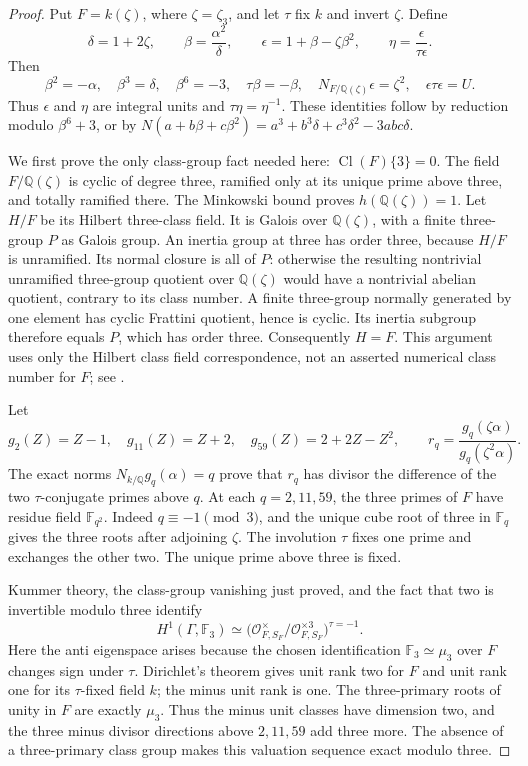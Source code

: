 \begin{proof}
Put \(F=k(\zeta)\), where \(\zeta=\zeta_3\), and let
\(\tau\) fix \(k\) and invert \(\zeta\).  Define
\[
 \delta=1+2\zeta,\qquad
 \beta=\frac{\alpha^2}{\delta},\qquad
 \epsilon=1+\beta-\zeta\beta^2,\qquad
 \eta=\frac{\epsilon}{\tau\epsilon}.
\tag{E.166.4}
\]
Then
\[
 \beta^2=-\alpha,\quad \beta^3=\delta,\quad
 \beta^6=-3,\quad \tau\beta=-\beta,\quad
 N_{F/\mathbb Q(\zeta)}\epsilon=\zeta^2,\quad
 \epsilon\tau\epsilon=U.
\tag{E.166.5}
\]
Thus \(\epsilon\) and \(\eta\) are integral units and
\(\tau\eta=\eta^{-1}\).  These identities follow by reduction
modulo \(\beta^6+3\), or by
\(N(a+b\beta+c\beta^2)=a^3+b^3\delta+c^3\delta^2-3abc\delta\).

We first prove the only class-group fact needed here:
\(\operatorname{Cl}(F)\{3\}=0\).  The field
\(F/\mathbb Q(\zeta)\) is cyclic of degree three, ramified only at
its unique prime above three, and totally ramified there.
The Minkowski bound proves \(h(\mathbb Q(\zeta))=1\).
Let \(H/F\) be its Hilbert three-class field.  It is Galois over
\(\mathbb Q(\zeta)\), with a finite three-group \(P\) as Galois group.
An inertia group at three has order three, because \(H/F\) is
unramified.  Its normal closure is all of \(P\): otherwise the
resulting nontrivial unramified three-group quotient over
\(\mathbb Q(\zeta)\) would have a nontrivial abelian quotient, contrary
to its class number.  A finite three-group normally generated by
one element has cyclic Frattini quotient, hence is cyclic.  Its
inertia subgroup therefore equals \(P\), which has order three.
Consequently \(H=F\).  This argument uses only the Hilbert class
field correspondence, not an asserted numerical class number for
\(F\); see \cite[Chapter V, \S3, especially Example 3.9]{RootMilneCFT}.

Let
\[
 g_2(Z)=Z-1,\quad g_{11}(Z)=Z+2,\quad
 g_{59}(Z)=2+2Z-Z^2,\qquad
 r_q=\frac{g_q(\zeta\alpha)}{g_q(\zeta^2\alpha)}.
\tag{E.166.6}
\]
The exact norms \(N_{k/\mathbb Q}g_q(\alpha)=q\) prove that
\(r_q\) has divisor the difference of the two \(\tau\)-conjugate
primes above \(q\).  At each \(q=2,11,59\), the three primes of
\(F\) have residue field \(\mathbb F_{q^2}\).  Indeed \(q\equiv-1\pmod3\),
and the unique cube root of three in \(\mathbb F_q\) gives the three
roots after adjoining \(\zeta\).  The involution \(\tau\) fixes
one prime and exchanges the other two.  The unique prime above
three is fixed.

Kummer theory, the class-group vanishing just proved, and the fact
that two is invertible modulo three identify
\[
 H^1(\Gamma,\mathbb F_3)
 \simeq
 \bigl(\mathcal O_{F,S_F}^{\times}/
              \mathcal O_{F,S_F}^{\times3}\bigr)^{\tau=-1}.
\tag{E.166.7}
\]
Here the anti eigenspace arises because the chosen identification
\(\mathbb F_3\simeq\mu_3\) over \(F\) changes sign under \(\tau\).
Dirichlet's theorem gives unit rank two for \(F\) and unit rank one
for its \(\tau\)-fixed field \(k\); the minus unit rank is one.
The three-primary roots of unity in \(F\) are exactly \(\mu_3\).
Thus the minus unit classes have dimension two, and the three
minus divisor directions above \(2,11,59\) add three more.
The absence of a three-primary class group makes this valuation
sequence exact modulo three.


\end{proof}
